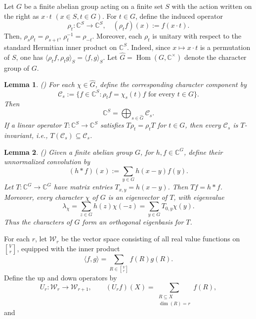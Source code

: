 \documentclass[11pt]{article}
\newtheorem{lemma}{Lemma}
\theoremstyle{definition}
\newcommand{\Gr}[2]{\genfrac{[}{]}{0pt}{}{#1}{#2}}
\begin{document}
Let $G$ be a finite abelian group acting on a finite set $S$ with the action written on the right as $x\cdot t$ $(x \in S, t \in G)$. For $t\in G$, define the induced operator 
\[\rho_t : \mathbb{C}^S \to \mathbb{C}^S, \quad (\rho_t f)(x) := f(x \cdot t).\]
Then, $\rho_s \rho_t = \rho_{s+t}$, $\rho_t^{-1}=\rho_{-t}$. Moreover, each $\rho_t$ is unitary with respect to the standard Hermitian inner product on $\mathbb{C}^S$. Indeed, since $x \mapsto x \cdot t$ is a permutation of $S$, one has $\langle \rho_tf,\rho_tg\rangle_S=\langle f,g\rangle_S$. Let $\widehat G=\operatorname{Hom}(G,\mathbb C^\times)$ denote the character group of $G$.

\begin{lemma}\label{lem:character decomposition}(\cite{Ceccherini2008})
For each $\chi\in\widehat G$, define the corresponding character component by
\[\mathcal{C}_s := \{ f \in \mathbb{C}^S : \rho_t f = \chi_s(t) f \text{ for every } t \in G \}.\]
Then\[\mathbb{C}^S = \bigoplus_{s \in \widehat G} \mathcal{C}_s.\]
If a linear operator $T : \mathbb{C}^S \to \mathbb{C}^S$ satisfies $T \rho_t = \rho_t T$ for $t \in G$, then every $\mathcal{C}_s$ is $T$-invariant, i.e., $T(\mathcal{C}_s)\subseteq\mathcal{C}_s$.
\end{lemma}

\begin{lemma}\label{lem: convolution}(\cite{Ceccherini2008})
Given a finite abelian group $G$, for $h, f \in \mathbb{C}^G$, define their unnormalized convolution by
\[
(h * f)(x) := \sum_{y \in G} h(x - y)f(y).
\]
Let $T : \mathbb{C}^G \to \mathbb{C}^G$ have matrix entries $T_{x,y} = h(x - y)$. Then $Tf = h * f$. Moreover, every character $\chi$ of $G$ is an eigenvector of $T$, with eigenvalue
\[
\lambda_\chi = \sum_{z \in G} h(z)\chi(-z) = \sum_{y \in G} T_{0,y}\chi(y).
\]
Thus the characters of $G$ form an orthogonal eigenbasis for $T$.
\end{lemma}

\vskip 2mm

For each $r$, let $\mathcal W_r$ be the vector space consisting of all real value functions on $\Gr{V}{r}$, equipped with the inner product
\[
\langle f,g\rangle=\sum_{R\in\Gr{V}{r}}f(R)g(R).
\]
Define the up and down operators by
\[
U_r:\mathcal W_r\to\mathcal W_{r+1},
\qquad
(U_rf)(X)=\sum_{\substack{R\subseteq X\\ \dim (R)=r}}f(R),
\]
and
\end{document}
